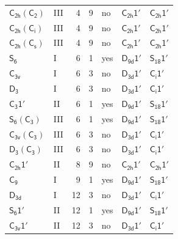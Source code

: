 \documentclass[10pt,a4paper]{article}
\numberwithin{equation}{section}
\newcommand{\grp}[1]{\mathsf{#1}}
\begin{document}
{\begin{longtable}{@{}llrrlll@{}}
\href{C2h-C2.pdf}{$\grp{C_{2h}}(\grp{C_{2}})$} & III & 4 & 9 & no & \href{C2h-1p.pdf}{$\grp{C_{2h}1'}$} & \href{C2h-1p.pdf}{$\grp{C_{2h}1'}$}\\
\href{C2h-S2.pdf}{$\grp{C_{2h}}(\grp{C_{i}})$} & III & 4 & 9 & no & \href{C2h-1p.pdf}{$\grp{C_{2h}1'}$} & \href{C2h-1p.pdf}{$\grp{C_{2h}1'}$}\\
\href{C2h-C1v.pdf}{$\grp{C_{2h}}(\grp{C_{s}})$} & III & 4 & 9 & no & \href{C2h-1p.pdf}{$\grp{C_{2h}1'}$} & \href{C2h-1p.pdf}{$\grp{C_{2h}1'}$}\\
\href{../../../rotation/data/pdf/S6.pdf}{$\grp{S_{6}}$} & I & 6 & 1 & yes & \href{D9d-1p.pdf}{$\grp{D_{9d}1'}$} & \href{S18-1p.pdf}{$\grp{S_{18}1'}$}\\
\href{../../../rotation/data/pdf/C3v.pdf}{$\grp{C_{3v}}$} & I & 6 & 3 & no & \href{D3d-1p.pdf}{$\grp{D_{3d}1'}$} & \href{S2-1p.pdf}{$\grp{C_{i}1'}$}\\
\href{../../../rotation/data/pdf/D3.pdf}{$\grp{D_{3}}$} & I & 6 & 3 & no & \href{D3d-1p.pdf}{$\grp{D_{3d}1'}$} & \href{S2-1p.pdf}{$\grp{C_{i}1'}$}\\
\href{C3-1p.pdf}{$\grp{C_{3}1'}$} & II & 6 & 1 & yes & \href{D9d-1p.pdf}{$\grp{D_{9d}1'}$} & \href{S18-1p.pdf}{$\grp{S_{18}1'}$}\\
\href{S6-C3.pdf}{$\grp{S_{6}}(\grp{C_{3}})$} & III & 6 & 1 & yes & \href{D9d-1p.pdf}{$\grp{D_{9d}1'}$} & \href{S18-1p.pdf}{$\grp{S_{18}1'}$}\\
\href{C3v-C3.pdf}{$\grp{C_{3v}}(\grp{C_{3}})$} & III & 6 & 3 & no & \href{D3d-1p.pdf}{$\grp{D_{3d}1'}$} & \href{S2-1p.pdf}{$\grp{C_{i}1'}$}\\
\href{D3-C3.pdf}{$\grp{D_{3}}(\grp{C_{3}})$} & III & 6 & 3 & no & \href{D3d-1p.pdf}{$\grp{D_{3d}1'}$} & \href{S2-1p.pdf}{$\grp{C_{i}1'}$}\\
\href{C2h-1p.pdf}{$\grp{C_{2h}1'}$} & II & 8 & 9 & no & \href{C2h-1p.pdf}{$\grp{C_{2h}1'}$} & \href{C2h-1p.pdf}{$\grp{C_{2h}1'}$}\\
\href{../../../rotation/data/pdf/C9.pdf}{$\grp{C_{9}}$} & I & 9 & 1 & yes & \href{D9d-1p.pdf}{$\grp{D_{9d}1'}$} & \href{S18-1p.pdf}{$\grp{S_{18}1'}$}\\
\href{../../../rotation/data/pdf/D3d.pdf}{$\grp{D_{3d}}$} & I & 12 & 3 & no & \href{D3d-1p.pdf}{$\grp{D_{3d}1'}$} & \href{S2-1p.pdf}{$\grp{C_{i}1'}$}\\
\href{S6-1p.pdf}{$\grp{S_{6}1'}$} & II & 12 & 1 & yes & \href{D9d-1p.pdf}{$\grp{D_{9d}1'}$} & \href{S18-1p.pdf}{$\grp{S_{18}1'}$}\\
\href{C3v-1p.pdf}{$\grp{C_{3v}1'}$} & II & 12 & 3 & no & \href{D3d-1p.pdf}{$\grp{D_{3d}1'}$} & \href{S2-1p.pdf}{$\grp{C_{i}1'}$}\\

\end{longtable}}
\end{document}
